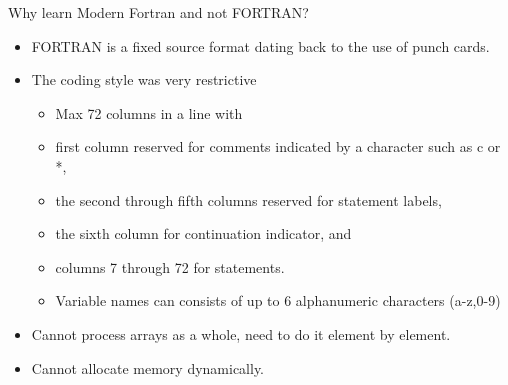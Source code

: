 \documentclass[c,mathserif,compress,xcolor=svgnames]{beamer}
\newenvironment{eblock}[0]
{
\begin{beamerboxesrounded}[upper=uppercol2,lower=lowercol2,shadow=true]}
{\end{beamerboxesrounded}}
\begin{document}
\begin{frame}{Why learn Modern Fortran and not FORTRAN?}
  \begin{itemize}
    \item FORTRAN is a fixed source format dating back to the use of punch cards.
    \item The coding style was very restrictive
    \begin{itemize}
      \item Max 72 columns in a line with
      \item first column reserved for comments indicated by a character such as c or *,
      \item the second through fifth columns reserved for statement labels,
      \item the sixth column for continuation indicator, and
      \item columns 7 through 72 for statements.
      \item Variable names can consists of up to 6 alphanumeric characters (a-z,0-9)
    \end{itemize}
    \item Cannot process arrays as a whole, need to do it element by element.
    \item Cannot allocate memory dynamically.
  \end{itemize}
\end{frame}

\begin{frame}[fragile]{FORTRAN 77 Example}
  \begin{eblock}{SAXPY Code}
    Fortran},basicstyle=\fontsize{6}{5}\selectfont\ttfamily]{./Exercise/saxpy.f}
  \end{eblock}
\end{frame}
\end{document}
